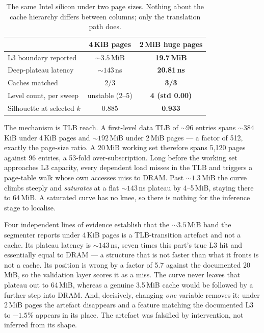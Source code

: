 \documentclass[conference]{IEEEtran}
\begin{document}
\begin{table}[t]
\caption{The same Intel silicon under two page sizes. Nothing about the cache
hierarchy differs between columns; only the translation path does.}
\label{tab:pagesize}
\centering
\footnotesize
\begin{tabular}{@{}lcc@{}}
\toprule
& \textbf{4\,KiB pages} & \textbf{2\,MiB huge pages} \\
\midrule
L3 boundary reported   & ${\sim}3.5$\,MiB & \textbf{19.7\,MiB} \\
Deep-plateau latency   & ${\sim}143$\,ns  & \textbf{20.81\,ns} \\
Caches matched         & 2/3              & \textbf{3/3} \\
Level count, per sweep & unstable (2--5)  & \textbf{4 (std 0.00)} \\
Silhouette at selected $k$ & 0.885        & \textbf{0.933} \\
\bottomrule
\end{tabular}
\end{table}

The mechanism is TLB reach. A first-level data TLB of ${\sim}96$ entries spans
${\sim}384$\,KiB under 4\,KiB pages and ${\sim}192$\,MiB under 2\,MiB pages ---
a factor of 512, exactly the page-size ratio. A 20\,MiB working set therefore
spans 5{,}120 pages against 96 entries, a 53-fold over-subscription. Long before
the working set approaches L3 capacity, every dependent load misses in the TLB
and triggers a page-table walk whose own accesses miss to DRAM. Past
${\sim}1.3$\,MiB the curve climbs steeply and \emph{saturates} at a flat
${\sim}143$\,ns plateau by 4--5\,MiB, staying there to 64\,MiB. A saturated curve
has no knee, so there is nothing for the inference stage to localise.

Four independent lines of evidence establish that the ${\sim}3.5$\,MiB band the
segmenter reports under 4\,KiB pages is a TLB-transition artefact and not a
cache. Its plateau latency is ${\sim}143$\,ns, seven times this part's true L3
hit and essentially equal to DRAM --- a structure that is not faster than what it
fronts is not a cache. Its position is wrong by a factor of 5.7 against the
documented 20\,MiB, so the validation layer scores it as a miss. The curve never
leaves that plateau out to 64\,MiB, whereas a genuine 3.5\,MiB cache would be
followed by a further step into DRAM. And, decisively, changing \emph{one}
variable removes it: under 2\,MiB pages the artefact disappears and a feature
matching the documented L3 to $-1.5\%$ appears in its place. The artefact was
falsified by intervention, not inferred from its shape.
\end{document}
